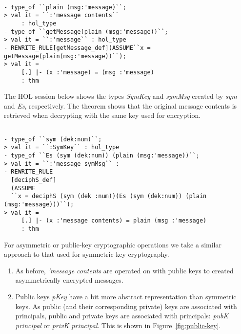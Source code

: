 \setcounter{sessioncount}{0}
\begin{session}
  \begin{scriptsize}
\begin{verbatim}

- type_of ``plain (msg:'message)``;
> val it = ``:'message contents``
     : hol_type
- type_of ``getMessage(plain (msg:'message))``;
> val it = ``:'message`` : hol_type
- REWRITE_RULE[getMessage_def](ASSUME``x = getMessage(plain(msg:'message))``);
> val it =
     [.] |- (x :'message) = (msg :'message)
     : thm
\end{verbatim}
  \end{scriptsize}
\end{session}


The HOL session below shows the types \emph{SymKey} and \emph{symMsg}
created by \emph{sym} and \emph{Es}, respectively.  The theorem shows
that the original message contents is retrieved when decrypting with
the same key used for encryption.
\begin{session}
  \begin{scriptsize}
\begin{verbatim}

- type_of ``sym (dek:num)``;
> val it = ``:SymKey`` : hol_type
- type_of ``Es (sym (dek:num)) (plain (msg:'message))``;
> val it = ``:'message symMsg`` :
- REWRITE_RULE
  [deciphS_def] 
  (ASSUME
  ``x = deciphS (sym (dek :num))(Es (sym (dek:num)) (plain (msg:'message)))``);
> val it =
     [.] |- (x :'message contents) = plain (msg :'message)
     : thm
\end{verbatim}
  \end{scriptsize}
\end{session}

For asymmetric or public-key cryptographic operations we take a
similar approach to that used for symmetric-key cryptography.
\begin{enumerate}
\item As before, \emph{'message contents} are operated on with public
  keys to created asymmetrically encrypted messages.
\item Public keys \emph{pKey} have a bit more abstract representation
  than symmetric keys. As public (and their corresponding private)
  keys are associated with principals, public and private keys are
  associated with principals: \emph{pubK principal} or \emph{privK
    principal}.  This is shown in Figure~\ref{fig:public-key}.
\end{enumerate}



